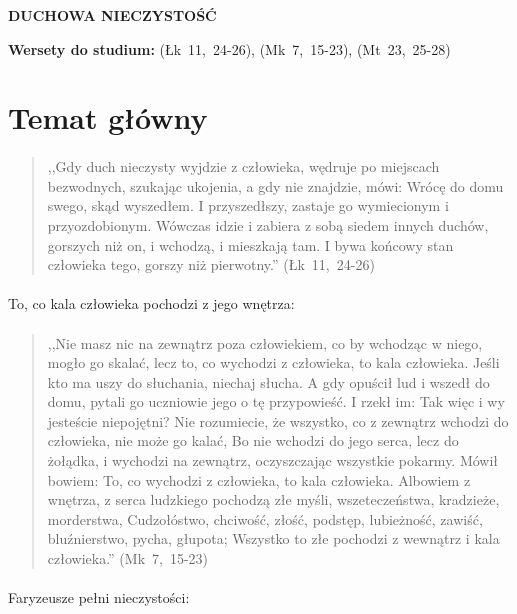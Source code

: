 \documentclass[10pt,a4paper,oneside]{article}
\begin{document}
\centerline{\textbf{\MakeUppercase{Duchowa nieczystość}}}
\begin{center}
\textbf{Wersety do studium:} \mbox{(Łk 11, 24-26)}, \mbox{(Mk 7, 15-23)}, \mbox{(Mt 23, 25-28)}
\end{center}
\section{Temat główny}
\paragraph{}
\begin{quote}
,,Gdy duch nieczysty wyjdzie z człowieka, wędruje po miejscach bezwodnych, szukając ukojenia, a gdy nie znajdzie, mówi: Wrócę do domu swego, skąd wyszedłem. I przyszedłszy, zastaje go wymiecionym i przyozdobionym. Wówczas idzie i zabiera z sobą siedem innych duchów, gorszych niż on, i wchodzą, i mieszkają tam. I bywa końcowy stan człowieka tego, gorszy niż pierwotny.'' \mbox{(Łk 11, 24-26)}
\end{quote}
\paragraph{}
To, co kala człowieka pochodzi z jego wnętrza:
\paragraph{}
\begin{quote}
,,Nie masz nic na zewnątrz poza człowiekiem, co by wchodząc w niego, mogło go skalać, lecz to, co wychodzi z człowieka, to kala człowieka. Jeśli kto ma uszy do słuchania, niechaj słucha. A gdy opuścił lud i wszedł do domu, pytali go uczniowie jego o tę przypowieść. I rzekł im: Tak więc i wy jesteście niepojętni? Nie rozumiecie, że wszystko, co z zewnątrz wchodzi do człowieka, nie może go kalać, Bo nie wchodzi do jego serca, lecz do żołądka, i wychodzi na zewnątrz, oczyszczając wszystkie pokarmy. Mówił bowiem: To, co wychodzi z człowieka, to kala człowieka. Albowiem z wnętrza, z serca ludzkiego pochodzą złe myśli, wszeteczeństwa, kradzieże, morderstwa, Cudzołóstwo, chciwość, złość, podstęp, lubieżność, zawiść, bluźnierstwo, pycha, głupota; Wszystko to złe pochodzi z wewnątrz i kala człowieka.'' \mbox{(Mk 7, 15-23)}
\end{quote}
\paragraph{}
Faryzeusze pełni nieczystości:
\end{document}
